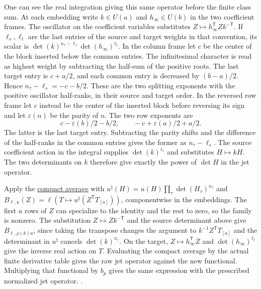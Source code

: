 One can see the real integration giving this same operator
before the finite class sum. At each embedding write
\(k\in U(a)\) and \(h_\infty\in U(b)\) in the two coefficient
frames. The oscillator on the coefficient variables substitutes
\(Z\mapsto h_\infty^{\mathsf T}Zk^{-\mathsf T}\).
If \(\ell_s,\ell_t\) are the last entries of the source and
target weights in that convention, its scalar is
\(\det(k)^{n_\tau-\ell_s}\det(h_\infty)^{\ell_t}\).
In the column frame let \(c\) be the center of the block
inserted below the common entries. The infinitesimal
character is read as highest weight by subtracting the
half-sum of the positive roots. The last target entry is
\(c+a/2\), and each common entry is decreased by
\((b-a)/2\). Hence \(n_\tau-\ell_s=-c-b/2\).
These are the two splitting exponents with the positive
oscillator half-ranks, in their source and target order.
In the reversed row frame let \(c\) instead be the center
of the inserted block before reversing its sign and let
\(\varepsilon(n)\) be the parity of \(n\).
The two row exponents are
\[
 c-\varepsilon(b)/2-b/2,\qquad
 -c+\varepsilon(a)/2+a/2.
\]
The latter is the last target entry. Subtracting the parity
shifts and the difference of the half-ranks in the common
entries gives the former as \(n_\tau-\ell_s\).
The source coefficient action in the integral supplies
\(\det(k)^{\ell_s}\) and substitutes \(H\mapsto kH\).
The two determinants on \(k\) therefore give exactly
the power of \(\det H\) in the jet operator.

Apply the \hyperlink{proof.compact-rectangular-average}{compact
average} with \(u^\natural(H)=u(H)\prod_\tau\det(H_\tau)^{n_\tau}\)
and \(B_{\ell,u}(Z)=\ell(T\mapsto u^\natural(Z^{\mathsf T}T_{[a]}))\),
componentwise in the embeddings. The first \(a\) rows of \(Z\)
can specialize to the identity and the rest to zero, so the family is nonzero.
The substitution \(Z\mapsto Zk^{-\mathsf T}\) and the source
determinant above give \(B_{\ell,\rho(k)u}\), since taking the
transpose changes the argument to \(k^{-1}Z^{\mathsf T}T_{[a]}\)
and the determinant in \(u^\natural\) cancels \(\det(k)^{n_\tau}\).
On the target, \(Z\mapsto h_\infty^{\mathsf T}Z\) and
\(\det(h_\infty)^{\ell_t}\) give the inverse real action on \(T\).
Evaluating the compact average by the actual finite derivative
table gives the raw jet operator against the new functional.
Multiplying that functional by \(b_p\) gives the same expression
with the prescribed normalized jet operator.
.

